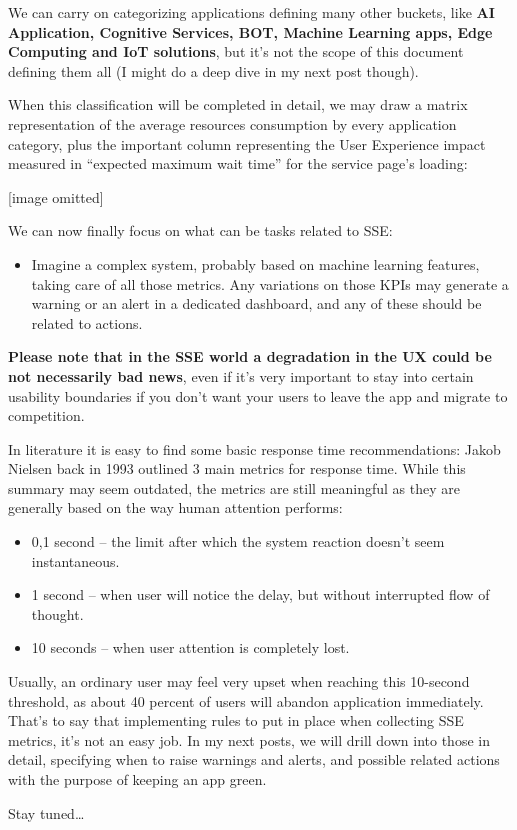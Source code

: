 \documentclass{article}
\begin{document}
We can carry on categorizing applications defining many other buckets, like \textbf{AI Application, Cognitive Services, BOT, Machine Learning apps, Edge Computing and IoT solutions}, but it’s not the scope of this document defining them all (I might do a deep dive in my next post though).

\vspace{\baselineskip}
When this classification will be completed in detail, we may draw a matrix representation of the average resources consumption by every application category, plus the important column representing the User Experience impact measured in “expected maximum wait time” for the service page’s loading:

\vspace{\baselineskip}
[image omitted]
\vspace{\baselineskip}

We can now finally focus on what can be tasks related to SSE:

\begin{itemize}
    \item Imagine a complex system, probably based on machine learning features, taking care of all those metrics. Any variations on those KPIs may generate a warning or an alert in a dedicated dashboard, and any of these should be related to actions.
\end{itemize}

\textbf{Please note that in the SSE world a degradation in the UX could be not necessarily bad news}, even if it’s very important to stay into certain usability boundaries if you don’t want your users to leave the app and migrate to competition.

\vspace{\baselineskip}
In literature it is easy to find some basic response time recommendations: Jakob Nielsen back in 1993 outlined 3 main metrics for response time. While this summary may seem outdated, the metrics are still meaningful as they are generally based on the way human attention performs:

\begin{itemize}
    \item 0,1 second – the limit after which the system reaction doesn’t seem instantaneous.
    \item 1 second – when user will notice the delay, but without interrupted flow of thought.
    \item 10 seconds – when user attention is completely lost.
\end{itemize}

Usually, an ordinary user may feel very upset when reaching this 10-second threshold, as about 40 percent of users will abandon application immediately. That’s to say that implementing rules to put in place when collecting SSE metrics, it’s not an easy job. In my next posts, we will drill down into those in detail, specifying when to raise warnings and alerts, and possible related actions with the purpose of keeping an app green.

\vspace{\baselineskip}
Stay tuned…
\end{document}
